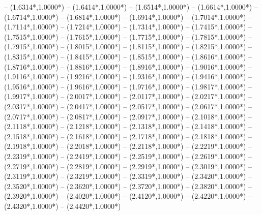 {	-- ({1.6314*\dx},{1.0000*\dy})
	-- ({1.6414*\dx},{1.0000*\dy})
	-- ({1.6514*\dx},{1.0000*\dy})
	-- ({1.6614*\dx},{1.0000*\dy})
	-- ({1.6714*\dx},{1.0000*\dy})
	-- ({1.6814*\dx},{1.0000*\dy})
	-- ({1.6914*\dx},{1.0000*\dy})
	-- ({1.7014*\dx},{1.0000*\dy})
	-- ({1.7114*\dx},{1.0000*\dy})
	-- ({1.7214*\dx},{1.0000*\dy})
	-- ({1.7314*\dx},{1.0000*\dy})
	-- ({1.7415*\dx},{1.0000*\dy})
	-- ({1.7515*\dx},{1.0000*\dy})
	-- ({1.7615*\dx},{1.0000*\dy})
	-- ({1.7715*\dx},{1.0000*\dy})
	-- ({1.7815*\dx},{1.0000*\dy})
	-- ({1.7915*\dx},{1.0000*\dy})
	-- ({1.8015*\dx},{1.0000*\dy})
	-- ({1.8115*\dx},{1.0000*\dy})
	-- ({1.8215*\dx},{1.0000*\dy})
	-- ({1.8315*\dx},{1.0000*\dy})
	-- ({1.8415*\dx},{1.0000*\dy})
	-- ({1.8515*\dx},{1.0000*\dy})
	-- ({1.8616*\dx},{1.0000*\dy})
	-- ({1.8716*\dx},{1.0000*\dy})
	-- ({1.8816*\dx},{1.0000*\dy})
	-- ({1.8916*\dx},{1.0000*\dy})
	-- ({1.9016*\dx},{1.0000*\dy})
	-- ({1.9116*\dx},{1.0000*\dy})
	-- ({1.9216*\dx},{1.0000*\dy})
	-- ({1.9316*\dx},{1.0000*\dy})
	-- ({1.9416*\dx},{1.0000*\dy})
	-- ({1.9516*\dx},{1.0000*\dy})
	-- ({1.9616*\dx},{1.0000*\dy})
	-- ({1.9716*\dx},{1.0000*\dy})
	-- ({1.9817*\dx},{1.0000*\dy})
	-- ({1.9917*\dx},{1.0000*\dy})
	-- ({2.0017*\dx},{1.0000*\dy})
	-- ({2.0117*\dx},{1.0000*\dy})
	-- ({2.0217*\dx},{1.0000*\dy})
	-- ({2.0317*\dx},{1.0000*\dy})
	-- ({2.0417*\dx},{1.0000*\dy})
	-- ({2.0517*\dx},{1.0000*\dy})
	-- ({2.0617*\dx},{1.0000*\dy})
	-- ({2.0717*\dx},{1.0000*\dy})
	-- ({2.0817*\dx},{1.0000*\dy})
	-- ({2.0917*\dx},{1.0000*\dy})
	-- ({2.1018*\dx},{1.0000*\dy})
	-- ({2.1118*\dx},{1.0000*\dy})
	-- ({2.1218*\dx},{1.0000*\dy})
	-- ({2.1318*\dx},{1.0000*\dy})
	-- ({2.1418*\dx},{1.0000*\dy})
	-- ({2.1518*\dx},{1.0000*\dy})
	-- ({2.1618*\dx},{1.0000*\dy})
	-- ({2.1718*\dx},{1.0000*\dy})
	-- ({2.1818*\dx},{1.0000*\dy})
	-- ({2.1918*\dx},{1.0000*\dy})
	-- ({2.2018*\dx},{1.0000*\dy})
	-- ({2.2118*\dx},{1.0000*\dy})
	-- ({2.2219*\dx},{1.0000*\dy})
	-- ({2.2319*\dx},{1.0000*\dy})
	-- ({2.2419*\dx},{1.0000*\dy})
	-- ({2.2519*\dx},{1.0000*\dy})
	-- ({2.2619*\dx},{1.0000*\dy})
	-- ({2.2719*\dx},{1.0000*\dy})
	-- ({2.2819*\dx},{1.0000*\dy})
	-- ({2.2919*\dx},{1.0000*\dy})
	-- ({2.3019*\dx},{1.0000*\dy})
	-- ({2.3119*\dx},{1.0000*\dy})
	-- ({2.3219*\dx},{1.0000*\dy})
	-- ({2.3319*\dx},{1.0000*\dy})
	-- ({2.3420*\dx},{1.0000*\dy})
	-- ({2.3520*\dx},{1.0000*\dy})
	-- ({2.3620*\dx},{1.0000*\dy})
	-- ({2.3720*\dx},{1.0000*\dy})
	-- ({2.3820*\dx},{1.0000*\dy})
	-- ({2.3920*\dx},{1.0000*\dy})
	-- ({2.4020*\dx},{1.0000*\dy})
	-- ({2.4120*\dx},{1.0000*\dy})
	-- ({2.4220*\dx},{1.0000*\dy})
	-- ({2.4320*\dx},{1.0000*\dy})
	-- ({2.4420*\dx},{1.0000*\dy})
}
